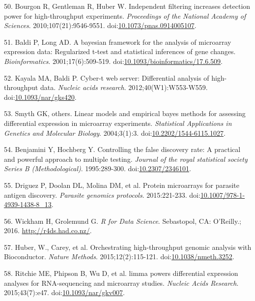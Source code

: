 \documentclass[a4paper]{article}
\begin{document}
\hypertarget{ref-bourgon2010filter}{}
50. Bourgon R, Gentleman R, Huber W. Independent filtering increases
detection power for high-throughput experiments. \emph{Proceedings of
the National Academy of Sciences}. 2010;107(21):9546-9551.
doi:\href{https://doi.org/10.1073/pnas.0914005107}{10.1073/pnas.0914005107}.

\hypertarget{ref-baldi2001cybert}{}
51. Baldi P, Long AD. A bayesian framework for the analysis of
microarray expression data: Regularized t-test and statistical
inferences of gene changes. \emph{Bioinformatics}. 2001;17(6):509-519.
doi:\href{https://doi.org/10.1093/bioinformatics/17.6.509}{10.1093/bioinformatics/17.6.509}.

\hypertarget{ref-kayala2012cyber}{}
52. Kayala MA, Baldi P. Cyber-t web server: Differential analysis of
high-throughput data. \emph{Nucleic acids research}.
2012;40(W1):W553-W559.
doi:\href{https://doi.org/10.1093/nar/gks420}{10.1093/nar/gks420}.

\hypertarget{ref-smyth2004ebayes}{}
53. Smyth GK, others. Linear models and empirical bayes methods for
assessing differential expression in microarray experiments.
\emph{Statistical Applications in Genetics and Molecular Biology}.
2004;3(1):3.
doi:\href{https://doi.org/10.2202/1544-6115.1027}{10.2202/1544-6115.1027}.

\hypertarget{ref-benjamini1995fdr}{}
54. Benjamini Y, Hochberg Y. Controlling the false discovery rate: A
practical and powerful approach to multiple testing. \emph{Journal of
the royal statistical society Series B (Methodological)}. 1995:289-300.
doi:\href{https://doi.org/10.2307/2346101}{10.2307/2346101}.

\hypertarget{ref-Driguez2015}{}
55. Driguez P, Doolan DL, Molina DM, et al. Protein microarrays for
parasite antigen discovery. \emph{Parasite genomics protocols}.
2015:221-233.
doi:\href{https://doi.org/10.1007/978-1-4939-1438-8_13}{10.1007/978-1-4939-1438-8\_13}.

\hypertarget{ref-wickham2016r4ds}{}
56. Wickham H, Grolemund G. \emph{R for Data Science}. Sebastopol, CA:
O'Reilly.; 2016. \url{http://r4ds.had.co.nz/}.

\hypertarget{ref-Biobase}{}
57. Huber, W., Carey, et al. Orchestrating high-throughput genomic
analysis with Bioconductor. \emph{Nature Methods}. 2015;12(2):115-121.
doi:\href{https://doi.org/10.1038/nmeth.3252}{10.1038/nmeth.3252}.

\hypertarget{ref-limma}{}
58. Ritchie ME, Phipson B, Wu D, et al. limma powers differential
expression analyses for RNA-sequencing and microarray studies.
\emph{Nucleic Acids Research}. 2015;43(7):e47.
doi:\href{https://doi.org/10.1093/nar/gkv007}{10.1093/nar/gkv007}.
\end{document}
